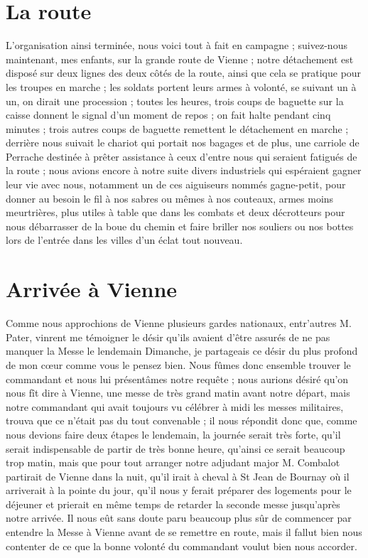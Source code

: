 \documentclass[11pt,a4paper]{report}
\begin{document}
\section*{La route}

L'organisation ainsi terminée, nous voici tout à fait en campagne ; suivez-nous maintenant, mes enfants, sur la grande route de Vienne ; notre détachement est disposé sur deux lignes des deux côtés de la route, ainsi que cela se pratique pour les troupes en marche ; les soldats portent leurs armes à volonté, se suivant un à un, on dirait une procession ; toutes les heures, trois coups de baguette sur la caisse donnent le signal d'un moment de repos ; on fait halte pendant cinq minutes ; trois autres coups de baguette remettent le détachement en marche ; derrière nous suivait le chariot qui portait nos bagages et de plus, une carriole de Perrache destinée à prêter assistance à ceux d'entre nous qui seraient fatigués de la route ; nous avions encore à notre suite divers industriels qui espéraient gagner leur vie avec nous, notamment un de ces aiguiseurs nommés gagne-petit, pour donner au besoin le fil à nos sabres ou mêmes à nos couteaux, armes moins meurtrières, plus utiles à table que dans les combats et deux décrotteurs pour nous débarrasser de la boue du chemin et faire briller nos souliers ou nos bottes lors de l'entrée dans les villes d'un éclat tout nouveau.

\section*{Arrivée à Vienne}

Comme nous approchions de Vienne plusieurs gardes nationaux, entr'autres M. Pater, vinrent me témoigner le désir qu'ils avaient d'être assurés de ne pas manquer la Messe le lendemain Dimanche, je partageais ce désir du plus profond de mon cœur comme vous le pensez bien. Nous fûmes donc ensemble trouver le commandant et nous lui présentâmes notre requête ; nous aurions désiré qu'on nous fît dire à Vienne, une messe de très grand matin avant notre départ, mais notre commandant qui avait toujours vu célébrer à midi les messes militaires, trouva que ce n'était pas du tout convenable ; il nous répondit donc que, comme nous devions faire deux étapes le lendemain, la journée serait très forte, qu'il serait indispensable de partir de très bonne heure, qu'ainsi ce serait beaucoup trop matin, mais que pour tout arranger notre adjudant major M. Combalot partirait de Vienne dans la nuit, qu'il irait à cheval à St Jean de Bournay où il arriverait à la pointe du jour, qu'il nous y ferait préparer des logements pour le déjeuner et prierait en même temps de retarder la seconde messe jusqu'après notre arrivée. Il nous eût sans doute paru beaucoup plus sûr de commencer par entendre la Messe à Vienne avant de se remettre en route, mais il fallut bien nous contenter de ce que la bonne volonté du commandant voulut bien nous accorder.
\end{document}
